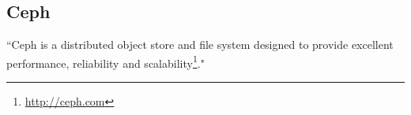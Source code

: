 \subsection{Ceph}
``Ceph is a distributed object store and file system designed to provide excellent performance, 
reliability and scalability\footnote{\url{http://ceph.com}}."


\iffalse
\subsection{Concoord}
Describe why it is not suitable for us. It allows single object sharing.

\section{Distributed Workflows}
For our last section of this chapter we also need to define some parameters in the beginning:
\begin{itemize}
\item Deployment complexity
\item Data provision methods
\item State preservation
\item Centralization
\item Required user rights
\item Runtime control
\item Applicability
\end{itemize}

In this section we introduce a number of existing scientific workflow systems.
\subsection{COSMOS}\cite{Gafni30062014}
\subsection{Weaver}\cite{Bui_weaver:integrating}
\fi
